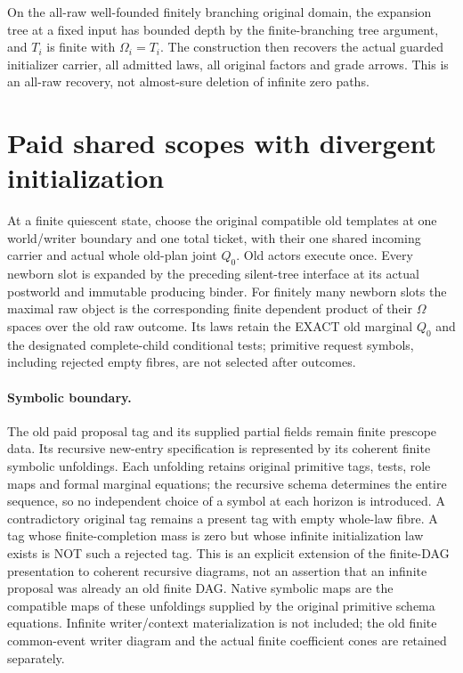 \documentclass[11pt]{article}
\begin{document}
On the all-raw well-founded finitely branching original domain, the expansion tree at a fixed input has bounded depth by the finite-branching tree argument, and $T_i$ is finite with $\Omega_i=T_i$. The construction then recovers the actual guarded initializer carrier, all admitted laws, all original factors and grade arrows. This is an all-raw recovery, not almost-sure deletion of infinite zero paths.

\section{Paid shared scopes with divergent initialization}
At a finite quiescent state, choose the original compatible old templates at one world/writer boundary and one total ticket, with their one shared incoming carrier and actual whole old-plan joint $Q_0$. Old actors execute once. Every newborn slot is expanded by the preceding silent-tree interface at its actual postworld and immutable producing binder. For finitely many newborn slots the maximal raw object is the corresponding finite dependent product of their $\Omega$ spaces over the old raw outcome. Its laws retain the EXACT old marginal $Q_0$ and the designated complete-child conditional tests; primitive request symbols, including rejected empty fibres, are not selected after outcomes.

\paragraph{Symbolic boundary.} The old paid proposal tag and its supplied partial fields remain finite prescope data. Its recursive new-entry specification is represented by its coherent finite symbolic unfoldings. Each unfolding retains original primitive tags, tests, role maps and formal marginal equations; the recursive schema determines the entire sequence, so no independent choice of a symbol at each horizon is introduced. A contradictory original tag remains a present tag with empty whole-law fibre. A tag whose finite-completion mass is zero but whose infinite initialization law exists is NOT such a rejected tag. This is an explicit extension of the finite-DAG presentation to coherent recursive diagrams, not an assertion that an infinite proposal was already an old finite DAG. Native symbolic maps are the compatible maps of these unfoldings supplied by the original primitive schema equations. Infinite writer/context materialization is not included; the old finite common-event writer diagram and the actual finite coefficient cones are retained separately.
\end{document}
